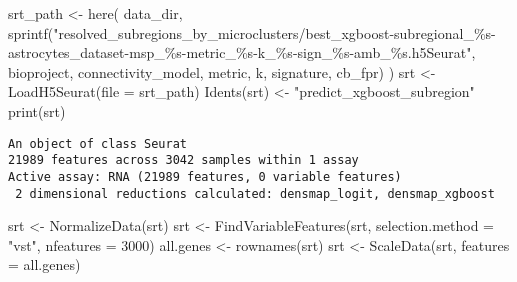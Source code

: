 \documentclass[
  letterpaper,
  DIV=11,
  numbers=noendperiod]{scrartcl}
\newenvironment{Shaded}{\begin{snugshade}}{\end{snugshade}}
\newcommand{\AttributeTok}[1]{\textcolor[rgb]{0.40,0.45,0.13}{#1}}
\newcommand{\DecValTok}[1]{\textcolor[rgb]{0.68,0.00,0.00}{#1}}
\newcommand{\FunctionTok}[1]{\textcolor[rgb]{0.28,0.35,0.67}{#1}}
\newcommand{\NormalTok}[1]{\textcolor[rgb]{0.00,0.23,0.31}{#1}}
\newcommand{\OtherTok}[1]{\textcolor[rgb]{0.00,0.23,0.31}{#1}}
\newcommand{\StringTok}[1]{\textcolor[rgb]{0.13,0.47,0.30}{#1}}
\begin{document}
\begin{Shaded}
\begin{Highlighting}[]
\NormalTok{srt\_path }\OtherTok{\textless{}{-}} \FunctionTok{here}\NormalTok{(}
\NormalTok{  data\_dir,}
  \FunctionTok{sprintf}\NormalTok{(}\StringTok{"resolved\_subregions\_by\_microclusters/best\_xgboost{-}subregional\_\%s{-}astrocytes\_dataset{-}msp\_\%s{-}metric\_\%s{-}k\_\%s{-}sign\_\%s{-}amb\_\%s.h5Seurat"}\NormalTok{, bioproject, connectivity\_model, metric, k, signature, cb\_fpr)}
\NormalTok{)}
\NormalTok{srt }\OtherTok{\textless{}{-}} \FunctionTok{LoadH5Seurat}\NormalTok{(}\AttributeTok{file =}\NormalTok{ srt\_path)}
\FunctionTok{Idents}\NormalTok{(srt) }\OtherTok{\textless{}{-}} \StringTok{"predict\_xgboost\_subregion"}
\FunctionTok{print}\NormalTok{(srt)}
\end{Highlighting}
\end{Shaded}

\begin{verbatim}
An object of class Seurat 
21989 features across 3042 samples within 1 assay 
Active assay: RNA (21989 features, 0 variable features)
 2 dimensional reductions calculated: densmap_logit, densmap_xgboost
\end{verbatim}

\begin{Shaded}
\begin{Highlighting}[]
\NormalTok{srt }\OtherTok{\textless{}{-}} \FunctionTok{NormalizeData}\NormalTok{(srt)}
\NormalTok{srt }\OtherTok{\textless{}{-}} \FunctionTok{FindVariableFeatures}\NormalTok{(srt, }\AttributeTok{selection.method =} \StringTok{"vst"}\NormalTok{, }\AttributeTok{nfeatures =} \DecValTok{3000}\NormalTok{)}
\NormalTok{all.genes }\OtherTok{\textless{}{-}} \FunctionTok{rownames}\NormalTok{(srt)}
\NormalTok{srt }\OtherTok{\textless{}{-}} \FunctionTok{ScaleData}\NormalTok{(srt, }\AttributeTok{features =}\NormalTok{ all.genes)}
\end{Highlighting}
\end{Shaded}
\end{document}
